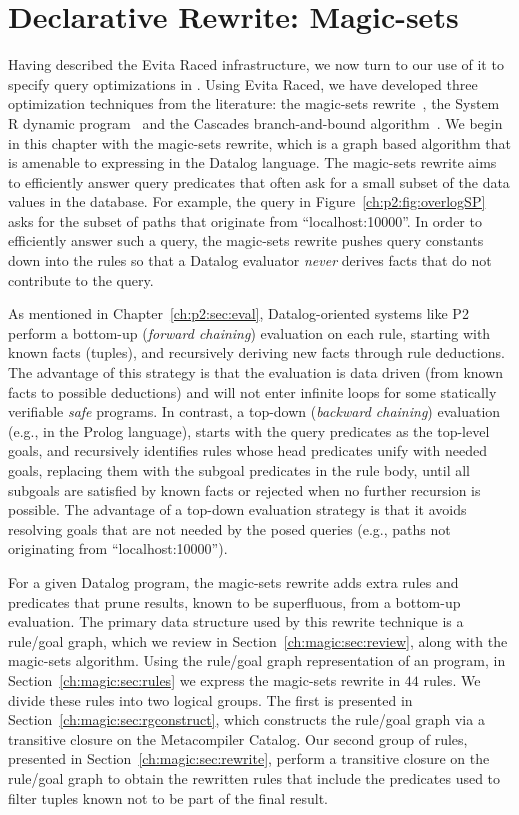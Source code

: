 \chapter[Declarative Rewrite: Magic-sets]{Declarative Rewrite: Magic-sets}
\label{ch:magic}

Having described the Evita Raced infrastructure, we now turn to our use of it
to specify query optimizations in \OVERLOG.  Using Evita Raced, we have
developed three optimization techniques from the literature: the magic-sets
rewrite~\cite{magic-sets1, magic-sets2}, the System R dynamic
program~\cite{selinger} and the Cascades branch-and-bound
algorithm~\cite{cascades}.  We begin in this chapter with the magic-sets
rewrite, which is a graph based algorithm that is amenable to expressing in the
Datalog language.  The magic-sets rewrite aims to efficiently answer query
predicates that often ask for a small subset of the data values in the
database.  For example, the  query in
Figure~\ref{ch:p2:fig:overlogSP} asks for the subset of paths that originate
from ``localhost:10000''.  In order to efficiently answer such a query, the
magic-sets rewrite pushes query constants down into the rules so that a Datalog
evaluator {\em never} derives facts that do not contribute to the query.

As mentioned in Chapter~\ref{ch:p2:sec:eval}, Datalog-oriented systems like P2
perform a bottom-up ({\em forward chaining}) evaluation on each rule, starting
with known facts (tuples), and recursively deriving new facts through rule
deductions.  The advantage of this strategy is that the evaluation is data
driven (from known facts to possible deductions) and will not enter infinite
loops for some statically verifiable {\em safe} programs.  In contrast, a
top-down ({\em backward chaining}) evaluation (e.g., in the Prolog language),
starts with the query predicates as the top-level goals, and recursively
identifies rules whose head predicates unify with needed goals, replacing them
with the subgoal predicates in the rule body, until all subgoals are satisfied
by known facts or rejected when no further recursion is possible.  The
advantage of a top-down evaluation strategy is that it avoids resolving goals
that are not needed by the posed queries (e.g., paths not originating from
``localhost:10000'').

For a given Datalog program, the magic-sets rewrite adds extra rules and
predicates that prune results, known to be superfluous, from a bottom-up
evaluation.  The primary data structure used by this rewrite technique is a
rule/goal graph, which we review in Section~\ref{ch:magic:sec:review}, along
with the magic-sets algorithm.  Using the rule/goal graph representation of an
\OVERLOG program, in Section~\ref{ch:magic:sec:rules} we express the magic-sets
rewrite in $44$ \OVERLOG rules.  We divide these rules into two logical groups.
The first is presented in Section~\ref{ch:magic:sec:rgconstruct}, which
constructs the rule/goal graph via a transitive closure on the Metacompiler
Catalog.  Our second group of rules, presented in
Section~\ref{ch:magic:sec:rewrite}, perform a transitive closure on the
rule/goal graph to obtain the rewritten rules that include the predicates used
to filter tuples known not to be part of the final result.

